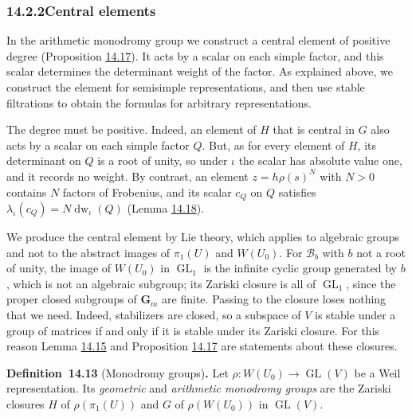 \documentclass[11pt]{article}
\newenvironment{bpstatement}[2]{\par\addvspace{0.6\baselineskip}\noindent\textbf{#1}#2\textbf{.}\enspace\ignorespaces}
  {\par\addvspace{0.4\baselineskip}}
\providecommand{\GL}{}\renewcommand{\GL}{\operatorname{GL}}
\begin{document}
\subsubsection*{\texorpdfstring{14.2.2\quad Central elements}{14.2.2 Central elements}}
\label{bp80}%
\label{bp81}%
In the arithmetic monodromy group we construct a central element of positive degree (Proposition \hyperref[bp92]{14.17}). It acts by a scalar on each simple factor, and this scalar determines the determinant weight of the factor. As explained above, we construct the element for semisimple representations, and then use stable filtrations to obtain the formulas for arbitrary representations.

The degree must be positive. Indeed, an element of \(H\) that is central in \(G\) also acts by a scalar on each simple factor \(Q\). But, as for every element of \(H\), its determinant on \(Q\) is a root of unity, so under \(\iota\) the scalar has absolute value one, and it records no weight. By contrast, an element \(z=h\rho(s)^N\) with \(N>0\) contains \(N\) factors of Frobenius, and its scalar \(c_Q\) on \(Q\) satisfies \(\lambda_\iota(c_Q)=N\operatorname{dw}_\iota(Q)\) (Lemma \hyperref[bp96]{14.18}).

We produce the central element by Lie theory, which applies to algebraic groups and not to the abstract images of \(\pi_1(U)\) and \(W(U_0)\). For \(\mathcal B_b\) with \(b\) not a root of unity, the image of \(W(U_0)\) in \(\GL_1\) is the infinite cyclic group generated by \(b\), which is not an algebraic subgroup; its Zariski closure is all of \(\GL_1\), since the proper closed subgroups of \(\mathbf G_m\) are finite. Passing to the closure loses nothing that we need. Indeed, stabilizers are closed, so a subspace of \(V\) is stable under a group of matrices if and only if it is stable under its Zariski closure. For this reason Lemma \hyperref[bp87]{14.15} and Proposition \hyperref[bp92]{14.17} are statements about these closures.

\label{bp82}%
\begin{bpstatement}{Definition~14.13}{ (Monodromy groups)}
Let \(\rho:W(U_0)\to\GL(V)\) be a Weil representation. Its \emph{geometric} and \emph{arithmetic monodromy groups} are the Zariski closures \(H\) of \(\rho(\pi_1(U))\) and \(G\) of \(\rho(W(U_0))\) in \(\GL(V)\).
\end{bpstatement}
\end{document}
